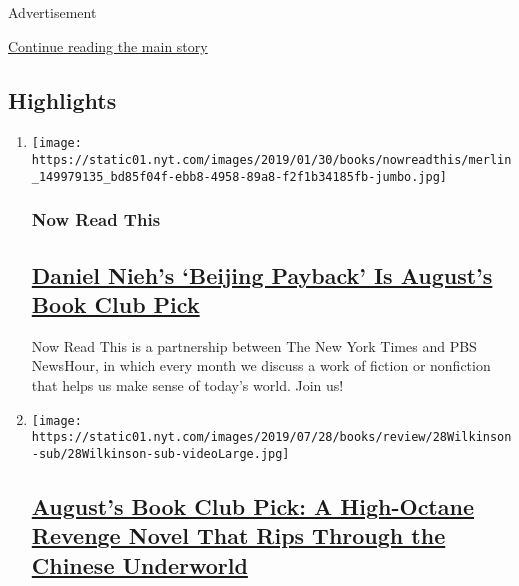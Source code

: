 Advertisement

\protect\hyperlink{after-subheader}{Continue reading the main story}

\hypertarget{highlights}{%
\subsection{Highlights}\label{highlights}}

\begin{enumerate}
\def\labelenumi{\arabic{enumi}.}
\item
  \texttt{[image: https://static01.nyt.com/images/2019/01/30/books/nowreadthis/merlin\_149979135\_bd85f04f-ebb8-4958-89a8-f2f1b34185fb-jumbo.jpg]}

  \hypertarget{now-read-this-1}{%
  \subsubsection{Now Read This}\label{now-read-this-1}}

  \hypertarget{daniel-niehs-beijing-payback-is-augusts-book-club-pick}{%
  \subsection{\texorpdfstring{\href{/2018/01/09/books/now-read-this.html}{Daniel
  Nieh's `Beijing Payback' Is August's Book Club
  Pick}}{Daniel Nieh's `Beijing Payback' Is August's Book Club Pick}}\label{daniel-niehs-beijing-payback-is-augusts-book-club-pick}}

  Now Read This is a partnership between The New York Times and PBS
  NewsHour, in which every month we discuss a work of fiction or
  nonfiction that helps us make sense of today's world. Join us!
\item
  \texttt{[image: https://static01.nyt.com/images/2019/07/28/books/review/28Wilkinson-sub/28Wilkinson-sub-videoLarge.jpg]}

  \hypertarget{augusts-book-club-pick-a-high-octane-revenge-novel-that-rips-through-the-chinese-underworld}{%
  \subsection{\texorpdfstring{\href{/2019/07/22/books/review/beijing-payback-daniel-nieh.html}{August's
  Book Club Pick: A High-Octane Revenge Novel That Rips Through the
  Chinese
  Underworld}}{August's Book Club Pick: A High-Octane Revenge Novel That Rips Through the Chinese Underworld}}\label{augusts-book-club-pick-a-high-octane-revenge-novel-that-rips-through-the-chinese-underworld}}


\end{enumerate}
